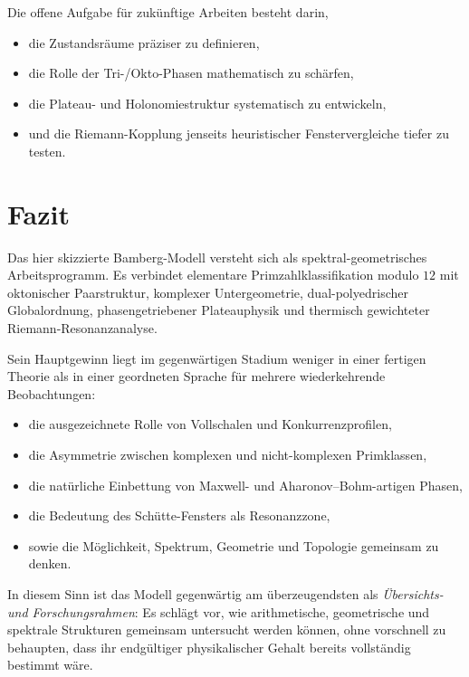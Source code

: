 \documentclass[11pt,a4paper]{article}
\theoremstyle{definition}
\theoremstyle{plain}
\begin{document}
	Die offene Aufgabe für zukünftige Arbeiten besteht darin,
	\begin{itemize}[leftmargin=2em]
		\item die Zustandsräume präziser zu definieren,
		\item die Rolle der Tri-/Okto-Phasen mathematisch zu schärfen,
		\item die Plateau- und Holonomiestruktur systematisch zu entwickeln,
		\item und die Riemann-Kopplung jenseits heuristischer Fenstervergleiche tiefer zu testen.
	\end{itemize}
	
	\section{Fazit}
	
	Das hier skizzierte Bamberg-Modell versteht sich als spektral-geometrisches Arbeitsprogramm. Es verbindet elementare Primzahlklassifikation modulo $12$ mit oktonischer Paarstruktur, komplexer Untergeometrie, dual-polyedrischer Globalordnung, phasengetriebener Plateauphysik und thermisch gewichteter Riemann-Resonanzanalyse.
	
	Sein Hauptgewinn liegt im gegenwärtigen Stadium weniger in einer fertigen Theorie als in einer geordneten Sprache für mehrere wiederkehrende Beobachtungen:
	\begin{itemize}[leftmargin=2em]
		\item die ausgezeichnete Rolle von Vollschalen und Konkurrenzprofilen,
		\item die Asymmetrie zwischen komplexen und nicht-komplexen Primklassen,
		\item die natürliche Einbettung von Maxwell- und Aharonov--Bohm-artigen Phasen,
		\item die Bedeutung des Schütte-Fensters als Resonanzzone,
		\item sowie die Möglichkeit, Spektrum, Geometrie und Topologie gemeinsam zu denken.
	\end{itemize}
	
	In diesem Sinn ist das Modell gegenwärtig am überzeugendsten als \emph{Übersichts- und Forschungsrahmen}: Es schlägt vor, wie arithmetische, geometrische und spektrale Strukturen gemeinsam untersucht werden können, ohne vorschnell zu behaupten, dass ihr endgültiger physikalischer Gehalt bereits vollständig bestimmt wäre.
	
\end{document}
